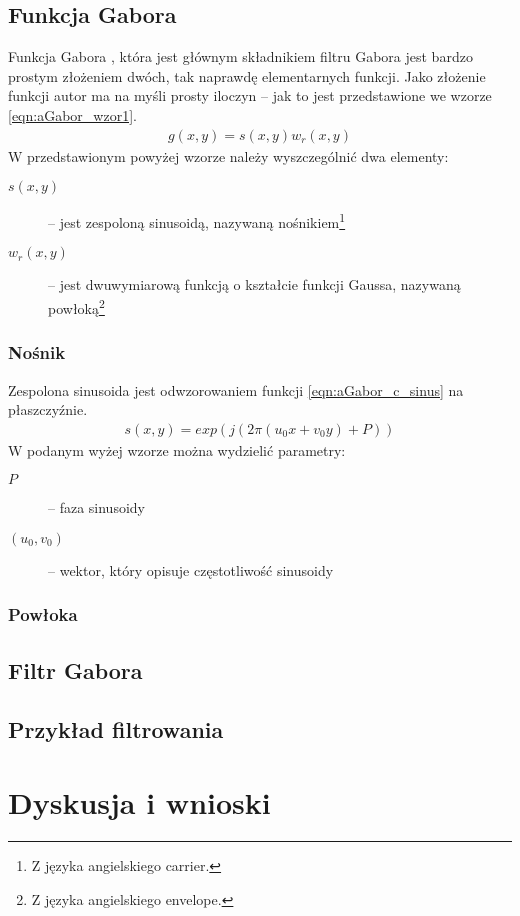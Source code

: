 \subsection{Funkcja Gabora}
\label{aGabor_funkcja}

Funkcja Gabora \cite{Movellan}, która jest głównym składnikiem filtru Gabora jest bardzo prostym złożeniem dwóch, tak naprawdę elementarnych funkcji. Jako złożenie funkcji autor ma na myśli prosty iloczyn -- jak to jest przedstawione we wzorze \ref{eqn:aGabor_wzor1}.
\begin{align}\label{eqn:aGabor_wzor1}
g(x, y) = s(x, y) w_r (x, y)
\end{align}
W przedstawionym powyżej wzorze należy wyszczególnić dwa elementy: 
\begin{description}
\item [$s(x, y)$] -- jest zespoloną sinusoidą, nazywaną nośnikiem\footnote{Z języka angielskiego carrier.}
\item [$w_r (x, y)$] -- jest dwuwymiarową funkcją o kształcie funkcji Gaussa, nazywaną powłoką\footnote{Z języka angielskiego envelope.}
\end{description}

\subsubsection{Nośnik}
\label{aGabor_carrier}

Zespolona sinusoida jest odwzorowaniem funkcji \ref{eqn:aGabor_c_sinus} na płaszczyźnie.
\begin{align}\label{eqn:aGabor_c_sinus}
s(x, y) = exp(j(2\pi(u_0x + v_0y)+P))
\end{align}
W podanym wyżej wzorze można wydzielić parametry:
\begin{description}
\item [$P$] -- faza sinusoidy
\item [$(u_0, v_0)$] -- wektor, który opisuje częstotliwość sinusoidy
\end{description}

\subsubsection{Powłoka}
\label{aGabor_envelope}

\subsection{Filtr Gabora}
\label{aGabor_filtr}


\subsection{Przykład filtrowania}
\label{aGabor_przyklad}


\section{Dyskusja i wnioski}
\label{aGabor_dyskusja}


